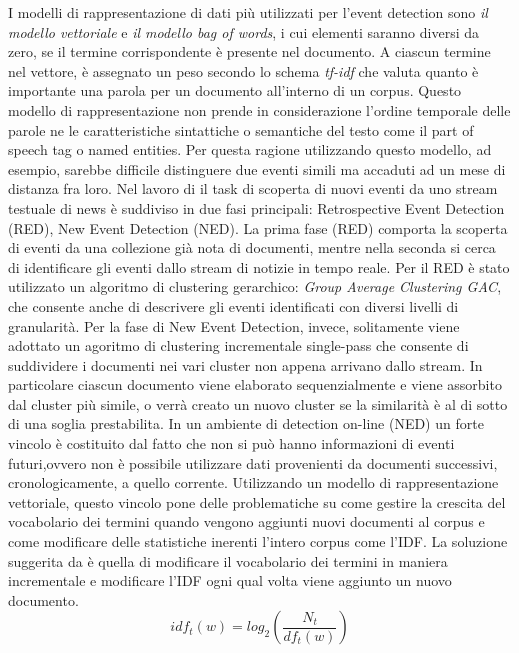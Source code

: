 \documentclass[a4paper,12pt]{report}
\begin{document}
I modelli di rappresentazione di dati più utilizzati per l'event detection sono  \emph{il modello vettoriale} e  \emph{il modello bag of words}, i cui elementi saranno diversi da zero, se il termine corrispondente è presente nel documento. A ciascun termine nel vettore, è assegnato un peso secondo lo schema \emph{tf-idf}\cite{Salton:1989:ATP:77013} che valuta quanto è importante una parola per un documento all'interno di un corpus. Questo modello di rappresentazione non prende in considerazione l'ordine temporale delle parole ne le caratteristiche sintattiche o semantiche del testo come il part of speech tag o named entities. Per questa ragione utilizzando questo modello, ad esempio, sarebbe difficile distinguere due eventi simili ma accaduti ad un mese di distanza fra loro. Nel lavoro di \cite{Yang:1998:SRO:290941.290953} il task di scoperta di nuovi eventi da uno stream testuale di news è suddiviso in due fasi principali:
Retrospective Event Detection (RED), New Event Detection (NED). La prima fase (RED) comporta la scoperta di eventi da una collezione già nota di documenti, mentre nella seconda si cerca di identificare gli eventi dallo stream di notizie in tempo reale. Per il RED è stato utilizzato un algoritmo di clustering gerarchico: \emph{Group Average Clustering GAC}, che consente anche di descrivere gli eventi identificati con diversi livelli di granularità. Per la fase di New Event Detection, invece, solitamente viene adottato un agoritmo di clustering incrementale single-pass \cite{Allan:2002:TDT:772260,Yang:1998:SRO:290941.290953} che consente di suddividere i documenti nei vari cluster non appena arrivano dallo stream. In particolare ciascun documento viene elaborato sequenzialmente e viene assorbito dal cluster più simile, o verrà creato un nuovo cluster se la similarità è al di sotto di una soglia prestabilita. In un ambiente di detection on-line (NED) un forte vincolo è costituito dal fatto che non si può hanno informazioni di eventi futuri,ovvero non è possibile utilizzare dati provenienti da documenti successivi, cronologicamente, a quello corrente. Utilizzando un modello di rappresentazione vettoriale, questo vincolo pone delle problematiche su come gestire la crescita del vocabolario dei termini quando vengono aggiunti nuovi documenti al corpus e come modificare delle statistiche inerenti l'intero corpus come l'IDF. La soluzione suggerita da  \cite{Yang:1998:SRO:290941.290953} è quella di modificare il vocabolario dei termini in maniera incrementale e modificare l'IDF ogni qual volta viene aggiunto un nuovo documento. 
\begin{equation}
\label{eq:incIDF}
idf_t(w)=log_2 \left(\frac{N_t}{df_t(w)} \right) 
\end{equation}
\end{document}
